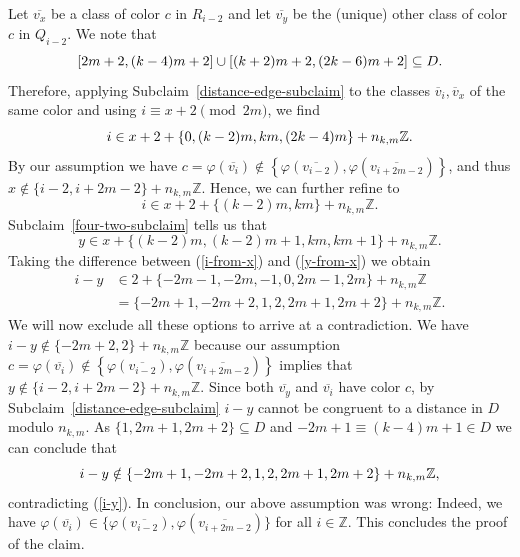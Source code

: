 \documentclass[a4paper,10pt,hidelinks]{amsart}
\newenvironment{claimproof}[1][\proofname]{\proof[#1]\renewcommand{\qedsymbol}{$\blacksquare$}}{\endproof}
\newenvironment{subclaimproof}[1][\proofname]{\proof[#1]\renewcommand{\qedsymbol}{$\blacklozenge$}}{\endproof}
\theoremstyle{definition}
\begin{document}
\begin{claimproof}[Proof of Claim~\ref{structure-claim} when $k \in \{6,8\}$]
\begin{subclaimproof}
            Let $\overline{v_{x}}$ be a class of color $c$ in $R_{i - 2}$ and let $\overline{v_{y}}$ be the (unique) other class of color $c$ in $Q_{i - 2}$. We note that 
            \begin{equation}\notag
                [2m + 2, (k - 4)m + 2] \cup [(k + 2)m + 2, (2k - 6)m + 2] \subseteq D. 
            \end{equation} 
            Therefore, applying Subclaim~\ref{distance-edge-subclaim} to the classes $\overline{v}_i, \overline{v}_x$ of the same color and using $i\equiv x + 2 \pmod{2m}$, we find
            \begin{equation}\notag
                i \in x + 2 + \{0, (k - 2)m, km, (2k-4)m\} + n_{k,m}\mathbb{Z}.
            \end{equation}
            By our assumption we have $c=\varphi(\overline{v_i}) \notin \left\{\varphi(\overline{v_{i - 2}}), \varphi(\overline{v_{i + 2m - 2}})\right\}$, and thus $x \notin \{i - 2, i + 2m - 2\} + n_{k,m}\mathbb{Z}$. Hence, we can further refine to
            \begin{equation}\label{i-from-x}
                i \in x + 2 + \{(k - 2)m, km\} + n_{k,m}\mathbb{Z}.
            \end{equation}
            Subclaim~\ref{four-two-subclaim} tells us that 
            \begin{equation}\label{y-from-x}
                y \in x + \{(k - 2)m, (k - 2)m + 1, km, km + 1 \} + n_{k,m}\mathbb{Z}.
            \end{equation}
            Taking the difference between (\ref{i-from-x}) and (\ref{y-from-x}) we obtain
            \begin{align}
                i - y &\in 2 + \{-2m - 1, -2m, -1, 0, 2m - 1, 2m\} + n_{k,m}\mathbb{Z} \\
                &= \{-2m + 1, -2m + 2, 1, 2, 2m + 1, 2m + 2\} + n_{k,m}\mathbb{Z}.\label{i-y}
            \end{align}
            We will now exclude all these options to arrive at a contradiction. We have $i - y \notin \{-2m + 2, 2\} + n_{k,m}\mathbb{Z}$ because our assumption $c=\varphi(\overline{v_i}) \notin \left\{\varphi(\overline{v_{i - 2}}), \varphi(\overline{v_{i + 2m - 2}})\right\}$ implies that $y \notin \{i - 2, i + 2m - 2\} + n_{k,m}\mathbb{Z}$. Since both $\overline{v_y}$ and $\overline{v_i}$ have color $c$, by Subclaim~\ref{distance-edge-subclaim} $i - y$ cannot be congruent to a distance in $D$ modulo $n_{k,m}$. As $\{1, 2m + 1, 2m + 2\} \subseteq D$ and $-2m + 1 \equiv (k - 4)m + 1 \in D$ we can conclude that
            \begin{equation}\notag
                i -y \notin \{-2m + 1, -2m + 2, 1, 2, 2m + 1, 2m + 2\} + n_{k,m}\mathbb{Z},
            \end{equation}
            contradicting (\ref{i-y}). In conclusion, our above assumption was wrong: Indeed, we have $\varphi(\overline{v_i}) \in \{\varphi(\overline{v_{i - 2}}), \varphi(\overline{v_{i + 2m - 2}})\}$ for all $i \in\mathbb{Z}$. This concludes the proof of the claim. 
        \end{subclaimproof}


\end{claimproof}
\end{document}
